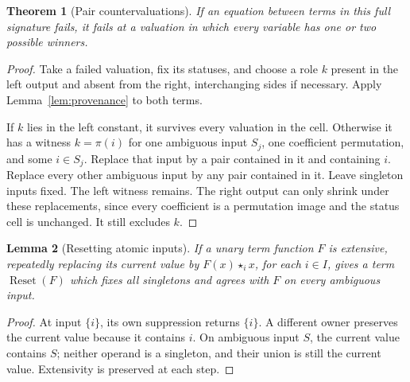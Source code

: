 \documentclass[11pt]{article}
\newtheorem{theorem}{Theorem}[section]
\newtheorem{lemma}[theorem]{Lemma}
\newcommand{\ow}[1]{\mathbin{\star_{#1}}}
\begin{document}
\begin{theorem}[Pair countervaluations]\label{thm:pairs}
If an equation between terms in this full signature fails, it fails at a
valuation in which every variable has one or two possible winners.
\end{theorem}
\begin{proof}
Take a failed valuation, fix its statuses, and choose a role $k$ present
in the left output and absent from the right, interchanging sides if
necessary. Apply Lemma~\ref{lem:provenance} to both terms.

If $k$ lies in the left constant, it survives every valuation in the
cell. Otherwise it has a witness $k=\pi(i)$ for one ambiguous input
$S_j$, one coefficient permutation, and some $i\in S_j$. Replace that
input by a pair contained in it and containing $i$. Replace every other
ambiguous input by any pair contained in it. Leave singleton inputs
fixed. The left witness remains. The right output can only shrink under
these replacements, since every coefficient is a permutation image and
the status cell is unchanged. It still excludes $k$.
\end{proof}

\begin{lemma}[Resetting atomic inputs]\label{lem:reset}
If a unary term function $F$ is extensive, repeatedly replacing its
current value by $F(x)\ow i x$, for each $i\in I$, gives a term
$\operatorname{Reset}(F)$ which fixes all singletons and agrees with $F$
on every ambiguous input.
\end{lemma}
\begin{proof}
At input $\{i\}$, its own suppression returns $\{i\}$. A different
owner preserves the current value because it contains $i$. On ambiguous
input $S$, the current value contains $S$; neither operand is a
singleton, and their union is still the current value. Extensivity is
preserved at each step.
\end{proof}
\end{document}
